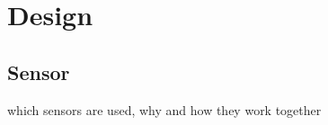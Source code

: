 \chapter{Design}
\label{ch:Design}

\section{Sensor}

which sensors are used, why and how they work together